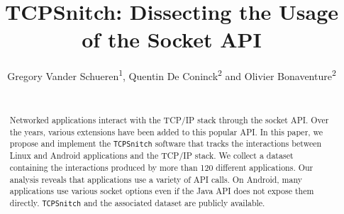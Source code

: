 \documentclass{sig-alternate-10pt}
\begin{document}
\title{TCPSnitch: Dissecting the Usage of the Socket API}


\newcommand{\tcpsnitch}{\texttt{TCPSnitch} }
\newcommand{\tcpsnitchns}{\texttt{TCPSnitch}}

\author{
\alignauthor Gregory Vander Schueren\textsuperscript{1}, Quentin De Coninck\textsuperscript{2} and Olivier Bonaventure\textsuperscript{2} \\
    \\
}
\maketitle

\begin{abstract}
Networked applications interact with the TCP/IP stack through
the socket API. Over the years, various extensions
have been added to this popular API. In this paper, we
propose and implement the \tcpsnitch software that
tracks the interactions between Linux and Android applications
and the TCP/IP stack. We collect a dataset containing the
interactions produced by more than 120 different applications.
Our analysis reveals that applications use a variety of
API calls. On Android, many applications use various socket
options even if the Java API does not expose them directly.
\tcpsnitch and the associated dataset are publicly available.
\end{abstract}







\newpage


\end{document}

